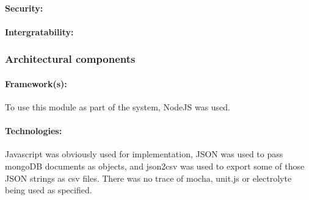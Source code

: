 \paragraph{Security:}
\par
\paragraph{Intergratability:}
\par


\subsubsection{Architectural components}
\paragraph {Framework(s):}
 To use this module as part of the system, NodeJS was used.
\par
\paragraph{Technologies:}
 Javascript was obviously used for implementation, JSON was used to pass mongoDB documents as objects, and json2csv was used to export some of those JSON strings as csv files. There was no trace of mocha, unit.js or electrolyte being used as specified.
\par
